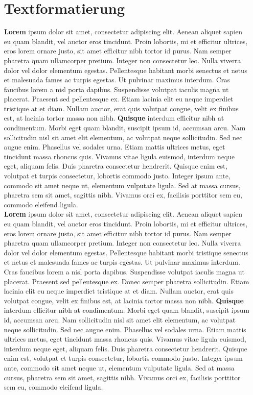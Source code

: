 \documentclass[a4paper, ngerman, oneside, 10pt]{article}
\begin{document}
\section{Textformatierung}
\textbf{Lorem} ipsum dolor sit amet, consectetur adipiscing elit. Aenean aliquet sapien eu quam blandit, vel auctor eros tincidunt. Proin lobortis, mi et efficitur ultrices, eros lorem ornare justo, sit amet efficitur nibh tortor id purus. Nam semper pharetra quam ullamcorper pretium. Integer non consectetur leo. Nulla viverra dolor vel dolor elementum egestas. Pellentesque habitant morbi senectus et netus et malesuada fames ac turpis egestas. Ut pulvinar maximus interdum. Cras faucibus lorem a nisl porta dapibus. Suspendisse volutpat iaculis magna ut placerat. Praesent sed pellentesque ex. Etiam lacinia elit eu neque imperdiet tristique at et diam. Nullam auctor, erat quis volutpat congue, velit ex finibus est, at lacinia tortor massa non nibh.\break
\textbf{Quisque} interdum efficitur nibh at condimentum. Morbi eget quam blandit, suscipit ipsum id, accumsan arcu. Nam sollicitudin nisl sit amet elit elementum, ac volutpat neque sollicitudin. Sed nec augue enim. Phasellus vel sodales urna. Etiam mattis ultrices metus, eget tincidunt massa rhoncus quis. Vivamus vitae ligula euismod, interdum neque eget, aliquam felis. Duis pharetra consectetur hendrerit. Quisque enim est, volutpat et turpis consectetur, lobortis commodo justo. Integer ipsum ante, commodo sit amet neque ut, elementum vulputate ligula. Sed at massa cursus, pharetra sem sit amet, sagittis nibh. Vivamus orci ex, facilisis porttitor sem eu, commodo eleifend ligula.\\
\textbf{Lorem} ipsum dolor sit amet, consectetur adipiscing elit. Aenean aliquet sapien eu quam blandit, vel auctor eros tincidunt. Proin lobortis, mi et efficitur ultrices, eros lorem ornare justo, sit amet efficitur nibh tortor id purus. Nam semper pharetra quam ullamcorper pretium. Integer non consectetur leo. Nulla viverra dolor vel dolor elementum egestas. Pellentesque habitant morbi tristique senectus et netus et malesuada fames ac turpis egestas. Ut pulvinar maximus interdum. Cras faucibus lorem a nisl porta dapibus. Suspendisse volutpat iaculis magna ut placerat. Praesent sed pellentesque ex. Donec semper pharetra sollicitudin. Etiam lacinia elit eu neque imperdiet tristique at et diam. Nullam auctor, erat quis volutpat congue, velit ex finibus est, at lacinia tortor massa non nibh.\smallbreak
\textbf{Quisque} interdum efficitur nibh at condimentum. Morbi eget quam blandit, suscipit ipsum id, accumsan arcu. Nam sollicitudin nisl sit amet elit elementum, ac volutpat neque sollicitudin. Sed nec augue enim. Phasellus vel sodales urna. Etiam mattis ultrices metus, eget tincidunt massa rhoncus quis. Vivamus vitae ligula euismod, interdum neque eget, aliquam felis. Duis pharetra consectetur hendrerit. Quisque enim est, volutpat et turpis consectetur, lobortis commodo justo. Integer ipsum ante, commodo sit amet neque ut, elementum vulputate ligula. Sed at massa cursus, pharetra sem sit amet, sagittis nibh. Vivamus orci ex, facilisis porttitor sem eu, commodo eleifend ligula.\bigbreak
\end{document}
